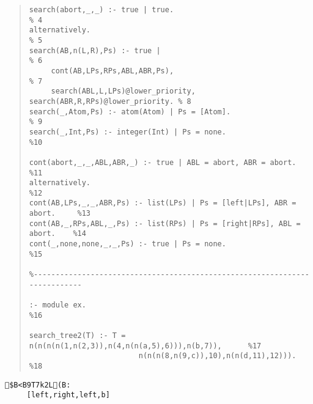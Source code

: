 {{{{{{\begin{quote}
\begin{verbatim}
search(abort,_,_) :- true | true.                                        % 4
alternatively.                                                           % 5
search(AB,n(L,R),Ps) :- true |                                           % 6
     cont(AB,LPs,RPs,ABL,ABR,Ps),                                        % 7
     search(ABL,L,LPs)@lower_priority, search(ABR,R,RPs)@lower_priority. % 8
search(_,Atom,Ps) :- atom(Atom) | Ps = [Atom].                           % 9
search(_,Int,Ps) :- integer(Int) | Ps = none.                            %10

cont(abort,_,_,ABL,ABR,_) :- true | ABL = abort, ABR = abort.            %11
alternatively.                                                           %12
cont(AB,LPs,_,_,ABR,Ps) :- list(LPs) | Ps = [left|LPs], ABR = abort.     %13
cont(AB,_,RPs,ABL,_,Ps) :- list(RPs) | Ps = [right|RPs], ABL = abort.    %14
cont(_,none,none,_,_,Ps) :- true | Ps = none.                            %15

%---------------------------------------------------------------------------

:- module ex.                                                            %16

search_tree2(T) :- T = n(n(n(n(1,n(2,3)),n(4,n(n(a,5),6))),n(b,7)),      %17
                         n(n(n(8,n(9,c)),10),n(n(d,11),12))).            %18
\end{verbatim}
\end{quote}

\begin{verbatim}
$B<B9T7k2L(B:
     [left,right,left,b]
\end{verbatim}

}}}}}}
